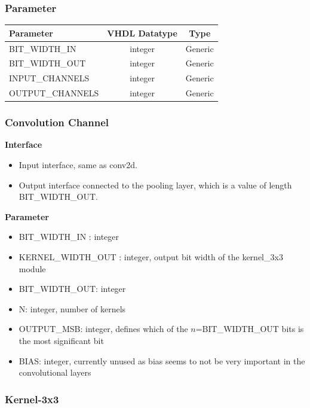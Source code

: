 \subsubsection{Parameter}

\begin{table}[hb]
	\centering
	\begin{tabular}{lcc}
		\toprule
		Parameter & VHDL Datatype & Type \\
		\midrule
		 BIT\_WIDTH\_IN & integer & Generic\\
		 BIT\_WIDTH\_OUT & integer & Generic \\
		 INPUT\_CHANNELS & integer & Generic\\
 	 	 OUTPUT\_CHANNELS & integer & Generic \\
		\bottomrule
	\end{tabular}
\end{table}

\subsubsection*{Convolution Channel}


\textbf{Interface}
\begin{itemize}
	\item Input interface, same as conv2d.
	\item Output interface connected to the pooling layer, which is a value of length BIT\_WIDTH\_OUT.
\end{itemize}

\textbf{Parameter}
\begin{itemize}
 	\item BIT\_WIDTH\_IN : integer
 	\item KERNEL\_WIDTH\_OUT : integer, output bit width of the kernel\_3x3 module
 	\item BIT\_WIDTH\_OUT: integer
 	\item N: integer, number of kernels
 	\item OUTPUT\_MSB: integer, defines which of the $n$=BIT\_WIDTH\_OUT bits is the most significant bit
 	\item BIAS: integer, currently unused as bias seems to not be very important in the convolutional layers
\end{itemize}

\subsubsection*{Kernel-3x3}

